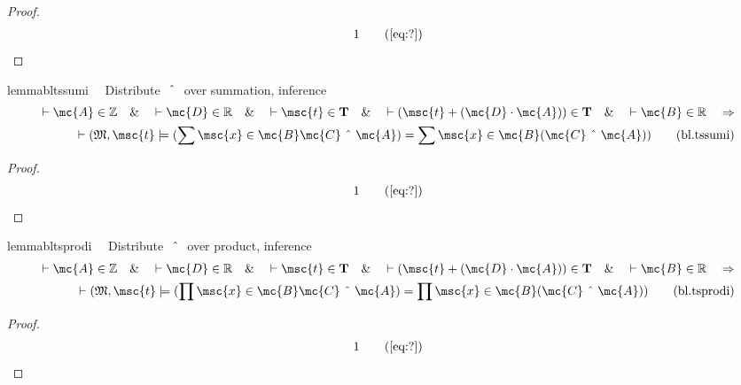 \begin{proof}
\begin{align}
  1 &&  & &(\mbox{\ref{eq:?}})\notag
\end{align}
\end{proof}

\begin{restatable}{lemma}{bltssumi}~~ Distribute $~\string^~$ over summation,
inference
\begin{align}
\vdash \mc{A} \in \mathbb{Z}\quad\&\quad \vdash \mc{D} \in
    \mathbb{R}\quad\&\quad \vdash \msc{t} \in \mathbf{T}\quad\&\quad \vdash (
    \msc{t} + ( \mc{D} \cdot \mc{A} ) ) \in \mathbf{T}\quad\&\quad \vdash
    \mc{B} \in \mathbb{R}\quad\Rightarrow \notag \\ 
	\quad \vdash ( \mathfrak{M} , \msc{t}
    \models ( \sum \msc{x} \in \mc{B} \mc{C} ~\string^~ \mc{A} ) = \sum \msc{x}
    \in \mc{B} ( \mc{C} ~\string^~ \mc{A} )
    )\label{eq:bl.tssumi}\tag{bl.tssumi}
\end{align}
\end{restatable}

\begin{proof}
\begin{align}
  1 &&  & &(\mbox{\ref{eq:?}})\notag
\end{align}
\end{proof}

\begin{restatable}{lemma}{bltsprodi}~~ Distribute $~\string^~$ over product,
inference
\begin{align}
\vdash \mc{A} \in \mathbb{Z}\quad\&\quad \vdash \mc{D} \in
    \mathbb{R}\quad\&\quad \vdash \msc{t} \in \mathbf{T}\quad\&\quad \vdash (
    \msc{t} + ( \mc{D} \cdot \mc{A} ) ) \in \mathbf{T}\quad\&\quad \vdash
    \mc{B} \in \mathbb{R}\quad\Rightarrow \notag \\ 
	\quad \vdash ( \mathfrak{M} , \msc{t}
    \models ( \prod \msc{x} \in \mc{B} \mc{C} ~\string^~ \mc{A} ) = \prod
    \msc{x} \in \mc{B} ( \mc{C} ~\string^~ \mc{A} )
    )\label{eq:bl.tsprodi}\tag{bl.tsprodi}
\end{align}
\end{restatable}

\begin{proof}
\begin{align}
  1 &&  & &(\mbox{\ref{eq:?}})\notag
\end{align}
\end{proof}

